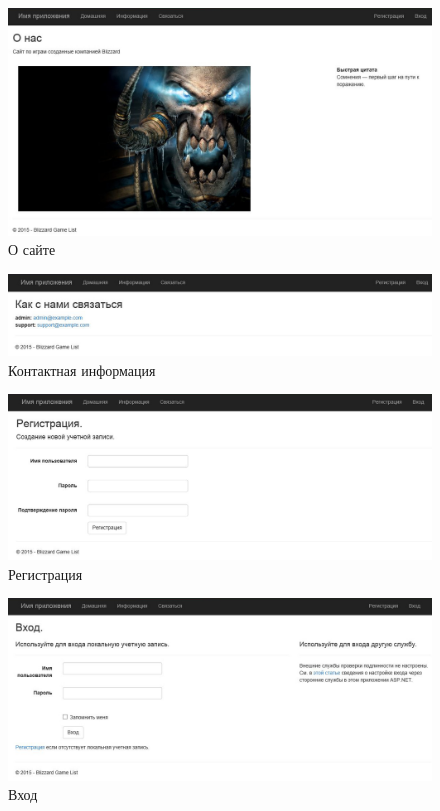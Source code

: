 \documentclass[pscyr, nonums]{hedlab}
\begin{document}
    \begin{figure}[ht]
        \center
        \includegraphics[width=1\textwidth]{Lab04_02}
        \caption{О сайте}
    \end{figure}
    \begin{figure}[ht]
        \center
        \includegraphics[width=1\textwidth]{Lab04_03}
        \caption{Контактная информация}
    \end{figure}

    \pagebreak

    \begin{figure}[ht]
        \center
        \includegraphics[width=1\textwidth]{Lab04_04}
        \caption{Регистрация}
    \end{figure}
    \begin{figure}[ht]
        \center
        \includegraphics[width=1\textwidth]{Lab04_05}
        \caption{Вход}
    \end{figure}
\end{document}
